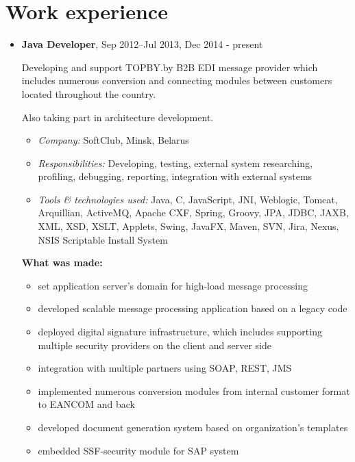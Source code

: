 \documentclass[a4paper, 12pt]{article}
\newcommand{\position}[1]{
    \textbf{#1}}
\newcommand{\itemlabel}[1]{
    \textit{#1:}}
\begin{document}
\section*{Work experience}

    \begin{itemize}

   
        \item \position{Java Developer}, Sep 2012--Jul 2013, Dec 2014 - present

            Developing and support TOPBY.by B2B EDI message provider which includes numerous conversion and connecting modules between customers located throughout the country.

            Also taking part in architecture development.
            	
            \begin{itemize}
                \item \itemlabel{Company} SoftClub, Minsk, Belarus
                \item \itemlabel{Responsibilities} Developing, testing, external system researching, profiling, debugging, reporting, integration with external systems
                \item \itemlabel{Tools \& technologies used} Java, C, JavaScript, JNI, Weblogic, Tomcat, Arquillian, ActiveMQ, Apache CXF, Spring, Groovy, JPA, JDBC, JAXB, XML, XSD, XSLT, Applets, Swing, JavaFX, Maven, SVN, Jira, Nexus, NSIS Scriptable Install System
            \end{itemize}
            
            \textbf{What was made:}
			\begin{itemize}
  				\item set application server's domain for high-load message processing
  				\item developed scalable message processing application based on a legacy code 
				\item deployed digital signature infrastructure, which includes supporting multiple security providers on the client and server side
  				\item integration with multiple partners using SOAP, REST, JMS
  				\item implemented numerous conversion modules from internal customer format to EANCOM and back
  				\item developed document generation system based on organization's templates
  				\item embedded SSF-security module for SAP system
			\end{itemize}
            

\end{itemize}
\end{document}
